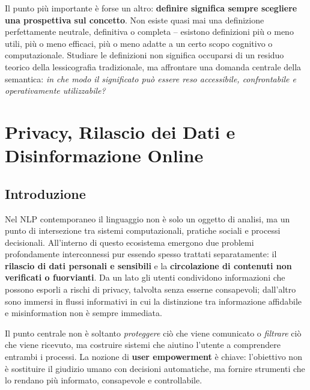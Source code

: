 \documentclass[12pt,a4paper]{article}
\begin{document}
\begin{quizbox}
Il punto pi\`u importante \`e forse un altro: \textbf{definire significa sempre scegliere una prospettiva sul concetto}. Non esiste quasi mai una definizione perfettamente neutrale, definitiva o completa -- esistono definizioni pi\`u o meno utili, pi\`u o meno efficaci, pi\`u o meno adatte a un certo scopo cognitivo o computazionale. Studiare le definizioni non significa occuparsi di un residuo teorico della lessicografia tradizionale, ma affrontare una domanda centrale della semantica: \emph{in che modo il significato pu\`o essere reso accessibile, confrontabile e operativamente utilizzabile?}
\end{quizbox}

\section{Privacy, Rilascio dei Dati e Disinformazione Online}

\subsection{Introduzione}

Nel NLP contemporaneo il linguaggio non \`e solo un oggetto di analisi, ma un punto di intersezione tra sistemi computazionali, pratiche sociali e processi decisionali. All'interno di questo ecosistema emergono due problemi profondamente interconnessi pur essendo spesso trattati separatamente: il \textbf{rilascio di dati personali e sensibili} e la \textbf{circolazione di contenuti non verificati o fuorvianti}. Da un lato gli utenti condividono informazioni che possono esporli a rischi di privacy, talvolta senza esserne consapevoli; dall'altro sono immersi in flussi informativi in cui la distinzione tra informazione affidabile e misinformation non \`e sempre immediata.

\begin{quizbox}
Il punto centrale non \`e soltanto \emph{proteggere} ci\`o che viene comunicato o \emph{filtrare} ci\`o che viene ricevuto, ma costruire sistemi che aiutino l'utente a comprendere entrambi i processi. La nozione di \textbf{user empowerment} \`e chiave: l'obiettivo non \`e sostituire il giudizio umano con decisioni automatiche, ma fornire strumenti che lo rendano pi\`u informato, consapevole e controllabile.
\end{quizbox}
\end{document}
